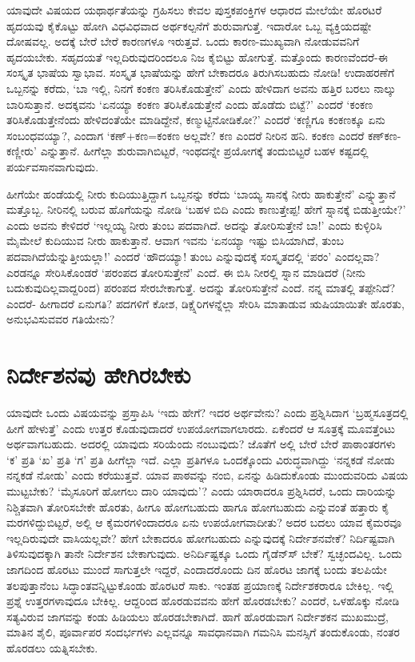 ಯಾವುದೇ ವಿಷಯದ ಯಥಾರ್ಥತೆಯನ್ನು ಗ್ರಹಿಸಲು ಕೇವಲ ಪುಸ್ತಕಪಂಕ್ತಿಗಳ ಆಧಾರದ ಮೇಲೆಯೇ ಹೊರಟರೆ ಹೃದಯವು ಕೈಕೊಟ್ಟು ಹೋಗಿ ವಿಧವಿಧವಾದ ಅರ್ಥಕಲ್ಪನೆಗೆ ಶುರುವಾಗುತ್ತೆ. ಇದಾರೋ ಒಬ್ಬ ವ್ಯಕ್ತಿಯದಷ್ಟೇ ದೋಷವಲ್ಲ. ಅದಕ್ಕೆ ಬೇರೆ ಬೇರೆ ಕಾರಣಗಳೂ ಇರುತ್ತವೆ. ಒಂದು ಕಾರಣ-ಮುಖ್ಯವಾಗಿ ನೋಡುವವನಿಗೆ ಹೃದಯಬೇಕು. ಸಹೃದಯತೆ ಇಲ್ಲದಿರುವುದರಿಂದಲೂ ನಿಜ ಕೈಬಿಟ್ಟು ಹೋಗುತ್ತೆ. ಮತ್ತೊಂದು ಕಾರಣವೆಂದರೆ-ಈ ಸಂಸ್ಕೃತ ಭಾಷೆಯ ಸ್ವಾಭಾವ. ಸಂಸ್ಕೃತ ಭಾಷೆಯನ್ನು ಹೇಗೆ ಬೇಕಾದರೂ ತಿರುಗಿಸಬಹುದು ನೋಡಿ! ಉದಾಹರಣೆಗೆ ಒಬ್ಬನನ್ನು ಕರೆದು, `ಬಾ ಇಲ್ಲಿ, ನಿನಗೆ ಕಂಕಣ ತರಿಸಿಕೊಡುತ್ತೇನೆ' ಎಂದು ಹೇಳಿದಾಗ ಅವನು ಹತ್ತಿರ ಬರಲು ನಾಲ್ಕು ಬಾರಿಸುತ್ತಾನೆ. ಅದಕ್ಕವನು `ಏನಯ್ಯಾ ಕಂಕಣ ತರಿಸಿಕೊಡುತ್ತೇನೆ ಎಂದು ಹೊಡೆದು ಬಿಟ್ಟೆ?' ಎಂದರೆ `ಕಂಕಣ ತರಿಸಿಕೊಡುತ್ತೇನೆಂದು ಹೇಳಿದಂತೆಯೇ ಮಾಡಿದ್ದೇನೆ, ಕಣ್ಮುಟ್ಟಿನೋಡಿಕೋ?' ಎಂದರೆ `ಕಣ್ಣಿಗೂ ಕಂಕಣಕ್ಕೂ ಏನು ಸಂಬಂಧವಯ್ಯಾ?, ಎಂದಾಗ `ಕಣ್+ಕಣ=ಕಂಕಣ ಅಲ್ಲವೇ? ಕಣ ಎಂದರೆ ನೀರಿನ ಹನಿ. ಕಂಕಣ ಎಂದರೆ ಕಣ್‌ಕಣ-ಕಣ್ಣೀರು' ಎನ್ನುತ್ತಾನೆ. ಹೀಗೆಲ್ಲಾ ಶುರುವಾಗಿಬಿಟ್ಟರೆ, ಇಂಥದನ್ನೇ ಪ್ರಯೋಗಕ್ಕೆ ತಂದುಬಿಟ್ಟರೆ ಬಹಳ ಕಷ್ಟದಲ್ಲಿ ಪರ್ಯವಸಾನವಾಗುವುದು.

ಹೀಗೆಯೇ ಹಂಡೆಯಲ್ಲಿ ನೀರು ಕುದಿಯುತ್ತಿದ್ದಾಗ ಒಬ್ಬನನ್ನು ಕರೆದು `ಬಾಯ್ಯ ಸಾನಕ್ಕೆ ನೀರು ಹಾಕುತ್ತೇನೆ' ಎನ್ನ್ನುತ್ತಾನೆ ಮತ್ತೊಬ್ಬ. ನೀರಿನಲ್ಲಿ ಬರುವ ಹೊಗೆಯನ್ನು ನೋಡಿ `ಬಹಳ ಬಿದಿ ಎಂದು ಕಾಣುತ್ತೇಪ್ಪ! ಹೇಗೆ ಸ್ನಾನಕ್ಕೆ ಬಿಡುತ್ತೀಯೇ?' ಎಂದು ಅವನು ಕೇಳಿದರೆ `ಇಲ್ಲಯ್ಯ ನೀರು ತುಂಬ ಪದವಾಗಿದೆ. ಅದನ್ನು ತೋರಿಸುತ್ತೇನೆ ಬಾ!' ಎಂದು ಕುಳ್ಳಿರಿಸಿ ಮೈಮೇಲೆ ಕುದಿಯುವ ನೀರು ಹಾಕುತ್ತಾನೆ. ಆವಾಗ ಇವನು `ಏನಯ್ಯಾ ಇಷ್ಟು ಬಿಸಿಯಾಗಿದೆ, ತುಂಬ ಪದವಾಗಿದೆಯೆನ್ನುತ್ತೀಯಲ್ಲಾ!' ಎಂದರೆ `ಹೌದಯ್ಯಾ! ತುಂಬ ಎನ್ನುವುದಕ್ಕೆ ಸಂಸ್ಕೃತದಲ್ಲಿ `ಪರಂ' ಎಂದಲ್ಲವಾ? ಎರಡನ್ನೂ ಸೇರಿಸಿಕೊಂಡರೆ `ಪರಂಪದ ತೋರಿಸುತ್ತೇನೆ' ಎಂದೆ. ಈ ಬಿಸಿ ನೀರಲ್ಲಿ ಸ್ನಾನ ಮಾಡಿದರೆ (ನೀನು ಬದುಕುವುದಿಲ್ಲವಾದ್ದರಿಂದ) ಪರಂಪದ ಸೇರಬೇಕಾಗುತ್ತೆ. ಅದನ್ನು ತೋರಿಸುತ್ತೇನೆ ಎಂದೆ. ನನ್ನ ಮಾತಲ್ಲಿ ತಪ್ಪೇನಿದೆ? ಎಂದರೆ- ಹೀಗಾದರೆ ಏನುಗತಿ? ಪದಗಳಿಗೆ ಕೋಶ, ಡಿಕ್ಷ್ನೆರಿಗಳನ್ನೆಲ್ಲಾ ಸೇರಿಸಿ ಮಾತಾಡುವ ಋಷಿಯಾಯಿತೇ ಹೊರತು, ಅನುಭವಿಸುವವರ ಗತಿಯೇನು?

\section*{ನಿರ್ದೇಶನವು ಹೇಗಿರಬೇಕು}

ಯಾವುದೇ ಒಂದು ವಿಷಯವನ್ನು ಪ್ರಸ್ತಾಪಿಸಿ `ಇದು ಹೇಗೆ? ಇದರ ಅರ್ಥವೇನು? ಎಂದು ಪ್ರಶ್ನಿಸಿದಾಗ `ಬ್ರಹ್ಮಸೂತ್ರದಲ್ಲಿ ಹೀಗೆ ಹೇಳುತ್ತೆ' ಎಂದು ಉತ್ತರ ಕೊಡುವುದಾದರೆ ಉಪಯೋಗವಾಗಲಾರದು. ಏಕೆಂದರೆ ಆ ಸೂತ್ರಕ್ಕೆ ಮೂವತ್ತೆಂಟು ಅರ್ಥವಾಗಬಹುದು. ಅದರಲ್ಲಿ ಯಾವುದು ಸರಿಯೆಂದು ನಂಬುವುದು? ಜೊತೆಗೆ ಅಲ್ಲಿ ಬೇರೆ ಬೇರೆ ಪಾಠಾಂತರಗಳು `ಕ' ಪ್ರತಿ `ಖ' ಪ್ರತಿ `ಗ' ಪ್ರತಿ ಹೀಗೆಲ್ಲಾ ಇದೆ. ಎಲ್ಲಾ ಪ್ರತಿಗಳೂ ಒಂದಕ್ಕೊಂದು ವಿರುದ್ಧವಾಗಿದ್ದು `ನನ್ನಕಡೆ ನೋಡು ನನ್ನಕಡೆ ನೋಡು' ಎಂದು ಕರೆಯುತ್ತವೆ. ಯಾವ ಪಾಠವನ್ನು ನಂಬಿ, ಏನನ್ನು ಹಿಡಿದುಕೊಂಡು ಮುಂದುವರಿದು ವಿಷಯ ಮುಟ್ಟಬೇಕು? `ಮೈಸೂರಿಗೆ ಹೋಗಲು ದಾರಿ ಯಾವುದು'? ಎಂದು ಯಾರಾದರೂ ಪ್ರಶ್ನಿಸಿದರೆ, ಒಂದು ದಾರಿಯನ್ನು ನಿಶ್ಚಿತವಾಗಿ ತೋರಿಸಬೇಕೇ ಹೊರತು, ಹೀಗೂ ಹೋಗಬಹುದು ಹಾಗೂ ಹೋಗಬಹುದು ಎನ್ನುವಂತೆ ಹತ್ತಾರು ಕೈ ಮರಗಳಿದ್ದುಬಿಟ್ಟರೆ, ಅಲ್ಲಿ ಆ ಕೈಮರಗಳಿಂದಾದರೂ ಏನು ಉಪಯೋಗವಾದೀತು? ಅದರ ಬದಲು ಯಾವ ಕೈಮರವೂ ಇಲ್ಲದಿರುವುದೇ ವಾಸಿಯಲ್ಲವೇ? ಹೇಗೆ ಬೇಕಾದರೂ ಹೋಗಬಹುದು ಎನ್ನುವುದಕ್ಕೆ ನಿರ್ದೇಶನವೇಕೆ? ನಿರ್ದಿಷ್ಟವಾಗಿ ತಿಳಿಸುವುದಕ್ಕಾಗಿ ತಾನೇ ನಿರ್ದೇಶನ ಬೇಕಾಗುವುದು. ಅನಿರ್ದಿಷ್ಟಕ್ಕೂ ಒಂದು ಗೈಡೆನ್‌ಸ್ ಬೇಕೆ? ಸ್ವಚ್ಛಂದವಿಲ್ಲ. ಒಂದು ಜಾಗದಿಂದ ಹೊರಟು ಮುಂದೆ ಸಾಗುತ್ತಲೇ ಇದ್ದರೆ, ಎಂದಾದರೊಂದು ದಿನ ಹೊರಟ ಜಾಗಕ್ಕೆ ಬಂದು ತಲಪಿಯೇ ತಲಪುತ್ತಾನೆಂಬ ಸಿದ್ಧಾಂತವನ್ನಿಟ್ಟುಕೊಂಡು ಹೊರಟರೆ ಸಾಕು. ಇಂತಹ ಪ್ರಯಾಣಕ್ಕೆ ನಿರ್ದೇಶಕರಾರೂ ಬೇಕಿಲ್ಲ. ಇಲ್ಲಿ ಪ್ರಶ್ನೆ ಉತ್ತರಗಳಾವುದೂ ಬೇಕಿಲ್ಲ. ಆದ್ದರಿಂದ ಹೊರಡುವವನು ಹೇಗೆ ಹೊರಡಬೇಕು? ಎಂದರೆ, ಒಳಹೊಕ್ಕು ನೋಡಿ ಸತ್ಯವಿರುವ ಜಾಗವನ್ನು ಕಂಡು ಹಿಡಿಯಲು ಹೊರಡಬೇಕಾಗಿದೆ. ಹಾಗೆ ಹೊರಡುವಾಗ ನಿರ್ದೇಶಕನ ಮುಖಮುದ್ರೆ, ಮಾತಿನ ಶೈಲಿ, ಪೂರ್ವಾಪರ ಸಂದರ್ಭಗಳು ಎಲ್ಲವನ್ನೂ ಸಾವಧಾನವಾಗಿ ಗಮನಿಸಿ ಮನಸ್ಸಿಗೆ ತಂದುಕೊಂಡು, ನಂತರ ಹೊರಡಲು ಯತ್ನಿಸಬೇಕು.

